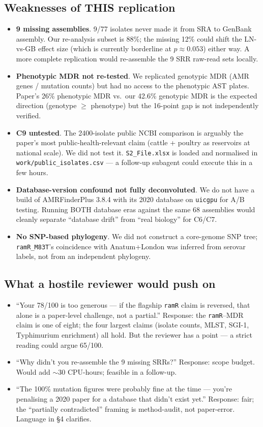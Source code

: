 \documentclass[11pt]{article}
\begin{document}
\subsection{Weaknesses of THIS replication}
\begin{itemize}
  \item \textbf{9 missing assemblies}. 9/77 isolates never made it from SRA to GenBank assembly. Our re-analysis subset is 88\%; the missing 12\% could shift the LN-vs-GB effect size (which is currently borderline at $p{\approx}0.053$) either way. A more complete replication would re-assemble the 9 SRR raw-read sets locally.
  \item \textbf{Phenotypic MDR not re-tested}. We replicated genotypic MDR (AMR genes / mutation counts) but had no access to the phenotypic AST plates. Paper's 26\% phenotypic MDR vs.\ our 42.6\% genotypic MDR is the expected direction (genotype $\ge$ phenotype) but the 16-point gap is not independently verified.
  \item \textbf{C9 untested}. The 2400-isolate public NCBI comparison is arguably the paper's most public-health-relevant claim (cattle + poultry as reservoirs at national scale). We did not test it. \texttt{S2\_File.xlsx} is loaded and normalised in \texttt{work/public\_isolates.csv} --- a follow-up subagent could execute this in a few hours.
  \item \textbf{Database-version confound not fully deconvoluted}. We do not have a build of AMRFinderPlus 3.8.4 with its 2020 database on \texttt{uicgpu} for A/B testing. Running BOTH database eras against the same 68 assemblies would cleanly separate ``database drift'' from ``real biology'' for C6/C7.
  \item \textbf{No SNP-based phylogeny}. We did not construct a core-genome SNP tree; \texttt{ramR\_M83T}'s coincidence with Anatum+London was inferred from serovar labels, not from an independent phylogeny.
\end{itemize}

\subsection{What a hostile reviewer would push on}
\begin{itemize}
  \item ``Your 78/100 is too generous --- if the flagship \texttt{ramR} claim is reversed, that alone is a paper-level challenge, not a partial.'' Response: the \texttt{ramR}--MDR claim is one of eight; the four largest claims (isolate counts, MLST, SGI-1, Typhimurium enrichment) all hold. But the reviewer has a point --- a strict reading could argue 65/100.
  \item ``Why didn't you re-assemble the 9 missing SRRs?'' Response: scope budget. Would add $\sim$30 CPU-hours; feasible in a follow-up.
  \item ``The 100\% mutation figures were probably fine at the time --- you're penalising a 2020 paper for a database that didn't exist yet.'' Response: fair; the ``partially contradicted'' framing is method-audit, not paper-error. Language in \S4 clarifies.
\end{itemize}
\end{document}

